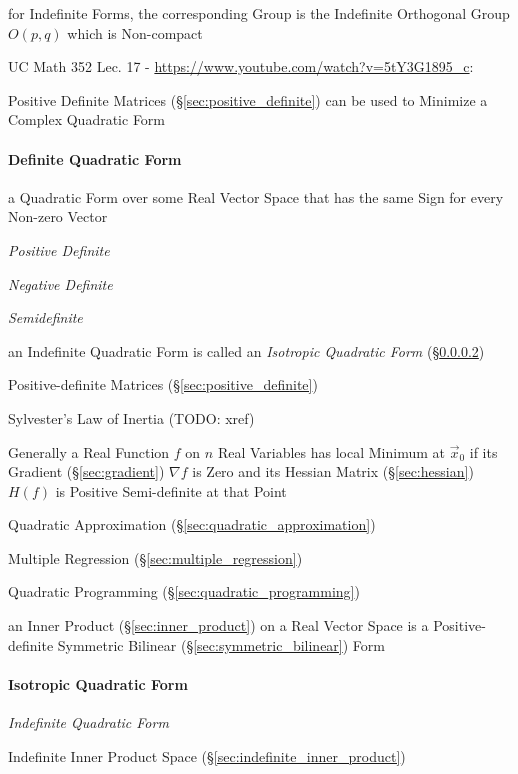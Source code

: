 for Indefinite Forms, the corresponding Group is the Indefinite Orthogonal
Group $O(p,q)$ which is Non-compact


UC Math 352 Lec. 17 - \url{https://www.youtube.com/watch?v=5tY3G1895_c}:

Positive Definite Matrices (\S\ref{sec:positive_definite}) can be used to
Minimize a Complex Quadratic Form



\paragraph{Definite Quadratic Form}\label{sec:definite_quadratic}\hfill

a Quadratic Form over some Real Vector Space that has the same Sign
for every Non-zero Vector

\emph{Positive Definite}

\emph{Negative Definite}

\emph{Semidefinite}

an Indefinite Quadratic Form is called an \emph{Isotropic Quadratic Form}
(\S\ref{sec:isotropic_quadratic_form})

\fist Positive-definite Matrices (\S\ref{sec:positive_definite})

\fist Sylvester's Law of Inertia (TODO: xref)

Generally a Real Function $f$ on $n$ Real Variables has local Minimum at
$\vec{x}_0$ if its Gradient (\S\ref{sec:gradient}) $\nabla f$ is Zero and its
Hessian Matrix (\S\ref{sec:hessian}) $H(f)$ is Positive Semi-definite at
that Point

\fist Quadratic Approximation (\S\ref{sec:quadratic_approximation})

\fist Multiple Regression (\S\ref{sec:multiple_regression})

\fist Quadratic Programming (\S\ref{sec:quadratic_programming})

an Inner Product (\S\ref{sec:inner_product}) on a Real Vector Space is
a Positive-definite Symmetric Bilinear
(\S\ref{sec:symmetric_bilinear}) Form



\paragraph{Isotropic Quadratic Form}\label{sec:isotropic_quadratic_form}\hfill

\emph{Indefinite Quadratic Form}

\fist Indefinite Inner Product Space (\S\ref{sec:indefinite_inner_product})



